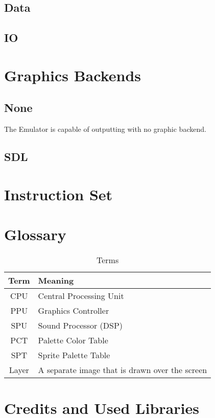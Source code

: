 \documentclass[10pt,a4paper]{article}
\begin{document}
		\subsection{Data}
		\subsection{IO}

	\section{Graphics Backends}
		\subsection{None}
			The Emulator is capable of outputting with no graphic backend.
		\subsection{SDL}
	
	\section{Instruction Set}
	\section{Glossary}
	\begin{table}[H]
		\centering
		\caption{Terms}
		\label{table-terms}
		\begin{tabular}{ c | l }
			Term & Meaning \\
			\hline
			CPU & Central Processing Unit \\
			PPU & Graphics Controller \\
			SPU & Sound Processor (DSP) \\
			PCT & Palette Color Table \\
			SPT & Sprite Palette Table \\
			Layer & A separate image that is drawn over the screen
		\end{tabular}
	\end{table}
	
	\section[Credits]{Credits and Used Libraries}
\end{document}
